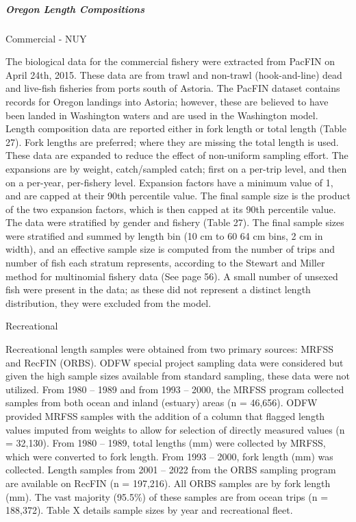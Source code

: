 \documentclass[11pt,
  english,
  letterpaper,
]{article}
\begin{document}
\hypertarget{oregon-length-compositions}{%
\subparagraph{Oregon Length Compositions}\label{oregon-length-compositions}}

Commercial - NUY

The biological data for the commercial fishery were extracted from PacFIN on April 24th, 2015. These data are from trawl and non-trawl (hook-and-line) dead and live-fish fisheries from ports south of Astoria. The PacFIN dataset contains records for Oregon landings into Astoria; however, these are believed to have been landed in Washington waters and are used in the Washington model. Length composition data are reported either in fork length or total length (Table 27). Fork lengths are preferred; where they are missing the total length is used. These data are expanded to reduce the effect of non-uniform sampling effort. The expansions are by weight, catch/sampled catch; first on a per-trip level, and then on a per-year, per-fishery level. Expansion factors have a minimum value of 1, and are capped at their 90th percentile value. The final sample size is the product of the two expansion factors, which is then capped at its 90th percentile value. The data were stratified by gender and fishery (Table 27). The final sample sizes were stratified and summed by length bin (10 cm to 60 64 cm bins, 2 cm in width), and an effective sample size is computed from the number of trips and number of fish each stratum represents, according to the Stewart and Miller method for multinomial fishery data (See page 56). A small number of unsexed fish were present in the data; as these did not represent a distinct length distribution, they were excluded from the model.

Recreational

Recreational length samples were obtained from two primary sources: MRFSS and RecFIN (ORBS). ODFW special project sampling data were considered but given the high sample sizes available from standard sampling, these data were not utilized. From 1980 -- 1989 and from 1993 -- 2000, the MRFSS program collected samples from both ocean and inland (estuary) areas (n = 46,656). ODFW provided MRFSS samples with the addition of a column that flagged length values imputed from weights to allow for selection of directly measured values (n = 32,130). From 1980 -- 1989, total lengths (mm) were collected by MRFSS, which were converted to fork length. From 1993 -- 2000, fork length (mm) was collected. Length samples from 2001 -- 2022 from the ORBS sampling program are available on RecFIN (n = 197,216). All ORBS samples are by fork length (mm). The vast majority (95.5\%) of these samples are from ocean trips (n = 188,372). Table X details sample sizes by year and recreational fleet.
\end{document}
